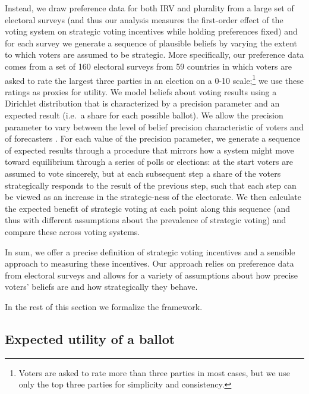 \documentclass[11pt,a4paper]{article}
\begin{document}
Instead, we draw preference data for both IRV and plurality from a large set of electoral surveys (and thus our analysis measures the first-order effect of the voting system on strategic voting incentives while holding preferences fixed) and for each survey we generate a sequence of plausible beliefs by varying the extent to which voters are assumed to be strategic. More specifically, our preference data comes from a set of 160 electoral surveys from 59 countries in which voters are asked to rate the largest three parties in an election on a 0-10 scale;\footnote{Voters are asked to rate more than three parties in most cases, but we use only the top three parties for simplicity and consistency.} we use these ratings as proxies for utility. We model beliefs about voting results using a Dirichlet distribution that is characterized by a precision parameter and an expected result (i.e.\ a share for each possible ballot). We allow the precision parameter to vary between the level of belief precision characteristic of voters \citep[according to][]{fisher2017strategic} and of forecasters \citep[according to][]{eggersvotes}. For each value of the precision parameter, we generate a sequence of expected results through a procedure that mirrors how a system might move toward equilibrium through a series of polls or elections: at the start voters are assumed to vote sincerely, but at each subsequent step a share of the voters strategically responds to the result of the previous step, such that each step can be viewed as an increase in the strategic-ness of the electorate. We then calculate the expected benefit of strategic voting at each point along this sequence (and thus with different assumptions about the prevalence of strategic voting) and compare these across voting systems. 

In sum, we offer a precise definition of strategic voting incentives and a sensible approach to measuring these incentives. Our approach relies on preference data from electoral surveys and allows for a variety of assumptions about how precise voters' beliefs are and how strategically they behave.

In the rest of this section we formalize the framework. 




\subsection{Expected utility of a ballot} 

\end{document}

